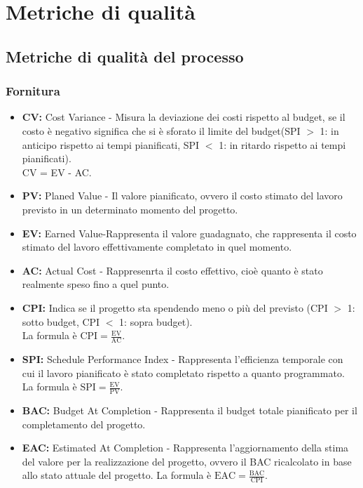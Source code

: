 \section{Metriche di qualità}
\subsection{Metriche di qualità del processo}
\subsubsection{Fornitura}
\begin{itemize}
    \item \textbf{CV:} Cost Variance - Misura la deviazione dei costi rispetto al budget, se il costo è negativo significa che si è sforato il limite del budget(SPI \( > \) 1: in anticipo rispetto ai tempi pianificati, SPI \( < \) 1: in ritardo rispetto ai tempi pianificati).
    \\CV = EV - AC.
    \item \textbf{PV:} Planed Value - Il valore pianificato, ovvero il costo stimato del lavoro previsto in un determinato momento del progetto.
    \item \textbf{EV:} Earned Value-Rappresenta il valore guadagnato, che rappresenta il costo stimato del lavoro effettivamente completato in quel momento.
    \item \textbf{AC:} Actual Cost - Rappresenrta il costo effettivo, cioè quanto è stato realmente speso fino a quel punto.
    \item \textbf{CPI:} Indica se il progetto sta spendendo meno o più del previsto (CPI \( > \) 1: sotto budget, CPI \( < \) 1: sopra budget). \\ La formula è \( \text{CPI} = \frac{\text{EV}}{\text{AC}} \).
    \item \textbf{SPI:} Schedule Performance Index - Rappresenta l'efficienza temporale con cui il lavoro pianificato è stato completato rispetto a quanto programmato.
    \\ La formula è \( \text{SPI} = \frac{\text{EV}}{\text{PV}} \).
    \item \textbf{BAC:} Budget At Completion - Rappresenta il budget totale pianificato per il completamento del progetto.
    \item \textbf{EAC:} Estimated At Completion - Rappresenta l'aggiornamento della stima del valore per la realizzazione del progetto, ovvero il BAC ricalcolato in base allo stato attuale del progetto.
    La formula è \( \text{EAC} = \frac{\text{BAC}}{\text{CPI}} \).

\end{itemize}
